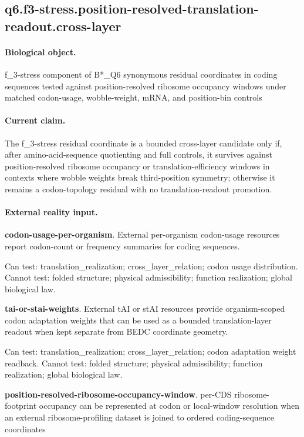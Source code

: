 \subsection{q6.f3-stress.position-resolved-translation-readout.cross-layer}

\paragraph{Biological object.} f\_3-stress component of B*\_Q6 synonymous residual coordinates in coding sequences tested against position-resolved ribosome occupancy windows under matched codon-usage, wobble-weight, mRNA, and position-bin controls

\paragraph{Current claim.} The f\_3-stress residual coordinate is a bounded cross-layer candidate only if, after amino-acid-sequence quotienting and full controls, it survives against position-resolved ribosome occupancy or translation-efficiency windows in contexts where wobble weights break third-position symmetry; otherwise it remains a codon-topology residual with no translation-readout promotion.

\paragraph{External reality input.}
\textbf{codon-usage-per-organism}. External per-organism codon-usage resources report codon-count or frequency summaries for coding sequences.

Can test: translation\_realization; cross\_layer\_relation; codon usage distribution. Cannot test: folded structure; physical admissibility; function realization; global biological law.

\textbf{tai-or-stai-weights}. External tAI or stAI resources provide organism-scoped codon adaptation weights that can be used as a bounded translation-layer readout when kept separate from BEDC coordinate geometry.

Can test: translation\_realization; cross\_layer\_relation; codon adaptation weight readback. Cannot test: folded structure; physical admissibility; function realization; global biological law.

\textbf{position-resolved-ribosome-occupancy-window}. per-CDS ribosome-footprint occupancy can be represented at codon or local-window resolution when an external ribosome-profiling dataset is joined to ordered coding-sequence coordinates

